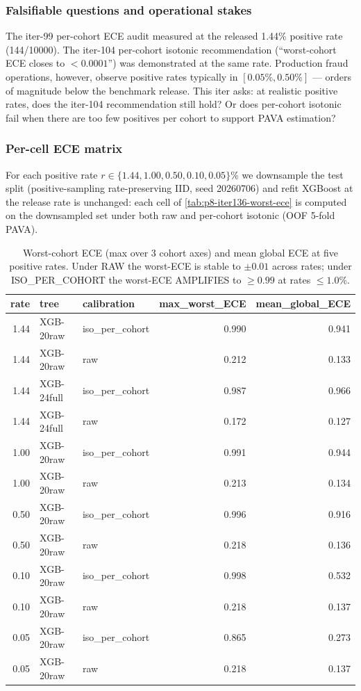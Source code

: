 \documentclass{article}
\begin{document}
\subsubsection{Falsifiable questions and operational stakes}

The iter-99 per-cohort ECE audit measured at the released 1.44\% positive
rate (144/10000). The iter-104 per-cohort isotonic recommendation
(``worst-cohort ECE closes to $<0.0001$'') was demonstrated at the same
rate. Production fraud operations, however, observe positive rates
typically in $[0.05\%, 0.50\%]$ --- orders of magnitude below the
benchmark release. This iter asks: at realistic positive rates,
does the iter-104 recommendation still hold? Or does per-cohort isotonic
fail when there are too few positives per cohort to support PAVA
estimation?

\subsubsection{Per-cell ECE matrix}

For each positive rate $r \in \{1.44, 1.00, 0.50, 0.10, 0.05\}$\% we
downsample the test split (positive-sampling rate-preserving IID, seed
20260706) and refit XGBoost at the release rate is unchanged: each cell
of \eqref{tab:p8-iter136-worst-ece} is computed on the downsampled set
under both raw and per-cohort isotonic (OOF 5-fold PAVA).

\begin{table}[h]
\centering\small
\begin{tabular}{r l l r r}
\toprule
rate & tree & calibration & max\_worst\_ECE & mean\_global\_ECE \\
\midrule
1.44 & XGB-20raw  & iso\_per\_cohort & 0.990 & 0.941 \\
1.44 & XGB-20raw  & raw              & 0.212 & 0.133 \\
1.44 & XGB-24full & iso\_per\_cohort & 0.987 & 0.966 \\
1.44 & XGB-24full & raw              & 0.172 & 0.127 \\
1.00 & XGB-20raw  & iso\_per\_cohort & 0.991 & 0.944 \\
1.00 & XGB-20raw  & raw              & 0.213 & 0.134 \\
0.50 & XGB-20raw  & iso\_per\_cohort & 0.996 & 0.916 \\
0.50 & XGB-20raw  & raw              & 0.218 & 0.136 \\
0.10 & XGB-20raw  & iso\_per\_cohort & 0.998 & 0.532 \\
0.10 & XGB-20raw  & raw              & 0.218 & 0.137 \\
0.05 & XGB-20raw  & iso\_per\_cohort & 0.865 & 0.273 \\
0.05 & XGB-20raw  & raw              & 0.218 & 0.137 \\
\bottomrule
\end{tabular}
\caption{Worst-cohort ECE (max over 3 cohort axes) and mean global ECE at
five positive rates. Under RAW the worst-ECE is stable to $\pm 0.01$
across rates; under ISO\_PER\_COHORT the worst-ECE AMPLIFIES to $\ge
0.99$ at rates $\le 1.0\%$.}
\label{tab:p8-iter136-worst-ece}
\end{table}
\end{document}
